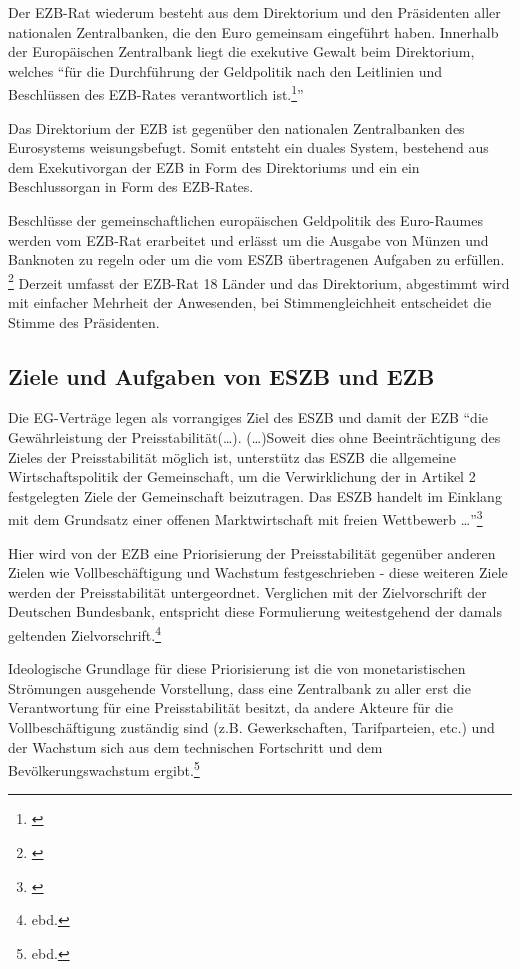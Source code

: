 \documentclass[
        onecolumn,
        a4paper,
        abstracton,
        parskip=half
        ,final
        ]{scrartcl}
\begin{document}
Der EZB-Rat wiederum besteht aus dem Direktorium und den Pr{\"a}sidenten aller nationalen Zentralbanken, die den Euro gemeinsam eingef{\"u}hrt haben. Innerhalb der Europ{\"a}ischen Zentralbank liegt die exekutive Gewalt beim Direktorium, welches "`f{\"u}r die Durchf{\"u}hrung der Geldpolitik nach den Leitlinien und Beschl{\"u}ssen des EZB-Rates verantwortlich ist.\footnote[47]{\citep[S.553]{Basseler2010}}"'

Das Direktorium der EZB ist gegen{\"u}ber den nationalen Zentralbanken des Eurosystems weisungsbefugt. Somit entsteht ein duales System, bestehend aus dem Exekutivorgan der EZB in Form des Direktoriums und ein ein Beschlussorgan in Form des EZB-Rates.

Beschl{\"u}sse der gemeinschaftlichen europ{\"a}ischen Geldpolitik des Euro-Raumes werden vom EZB-Rat erarbeitet und erl{\"a}sst um die Ausgabe von M{\"u}nzen und Banknoten zu regeln oder um die vom ESZB {\"u}bertragenen Aufgaben zu erf{\"u}llen. \footnote[100]{\citep[vgl.][S.553]{Basseler2010}}
Derzeit umfasst der EZB-Rat 18 L{\"a}nder und das Direktorium, abgestimmt wird mit einfacher Mehrheit der Anwesenden, bei Stimmengleichheit entscheidet die Stimme des Pr{\"a}sidenten.


\subsection{Ziele und Aufgaben von ESZB und EZB}
Die EG-Vertr{\"a}ge legen als vorrangiges Ziel des ESZB und damit der EZB "`die Gew{\"a}hrleistung der Preisstabilit{\"a}t(\ldots). (\ldots)Soweit dies ohne Beeintr{\"a}chtigung des Zieles der Preisstabilit{\"a}t m{\"o}glich ist, unterst{\"u}tz das ESZB die allgemeine Wirtschaftspolitik der Gemeinschaft, um die Verwirklichung der in Artikel 2 festgelegten Ziele der Gemeinschaft beizutragen. Das ESZB handelt im Einklang mit dem Grundsatz einer offenen Marktwirtschaft mit freien Wettbewerb \ldots"'\footnote[48]{\citep[vgl.][S.554]{Basseler2010}}

Hier wird von der EZB eine Priorisierung der Preisstabilit{\"a}t gegen{\"u}ber anderen Zielen wie Vollbesch{\"a}ftigung und Wachstum festgeschrieben - diese weiteren Ziele werden der Preisstabilit{\"a}t untergeordnet. Verglichen mit der Zielvorschrift der Deutschen Bundesbank, entspricht diese Formulierung weitestgehend der damals geltenden Zielvorschrift.\footnote[49]{ebd.}

Ideologische Grundlage f{\"u}r diese Priorisierung ist die von monetaristischen Str{\"o}mungen ausgehende Vorstellung, dass eine Zentralbank zu aller erst die Verantwortung f{\"u}r eine Preisstabilit{\"a}t besitzt, da andere Akteure f{\"u}r die Vollbesch{\"a}ftigung zust{\"a}ndig sind (z.B. Gewerkschaften, Tarifparteien, etc.) und der Wachstum sich aus dem technischen Fortschritt und dem Bev{\"o}lkerungswachstum ergibt.\footnote[50]{ebd.}
\end{document}

